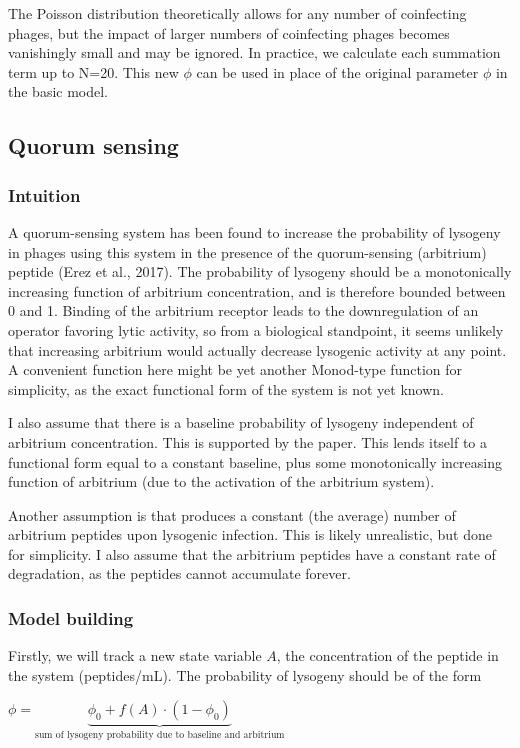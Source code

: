 \documentclass{article}
\begin{document}
 
The Poisson distribution theoretically allows for any number of coinfecting phages, but the impact of larger numbers of coinfecting phages becomes vanishingly small and may be ignored. In practice, we calculate each summation term up to N=20. This new $\phi$ can be used in place of the original parameter $\phi$ in the basic model.

\subsection{Quorum sensing}
\subsubsection{Intuition}
A quorum-sensing system has been found to increase the probability of lysogeny in phages using this system in the presence of the quorum-sensing (arbitrium) peptide (Erez et al., 2017). 
The probability of lysogeny should be a monotonically increasing function of arbitrium concentration, and is therefore bounded between 0 and 1. Binding of the arbitrium receptor leads to the downregulation of an operator favoring lytic activity, so from a biological standpoint, it seems unlikely that increasing arbitrium would actually decrease lysogenic activity at any point. A convenient function here might be yet another Monod-type function for simplicity, as the exact functional form of the system is not yet known. 

I also assume that there is a baseline probability of lysogeny independent of arbitrium concentration. This is supported by the paper. This lends itself to a functional form equal to a constant baseline, plus some monotonically increasing function of arbitrium (due to the activation of the arbitrium system).

Another assumption is that produces a constant (the average) number of arbitrium peptides upon lysogenic infection. This is likely unrealistic, but done for simplicity. I also assume that the arbitrium peptides have a constant rate of degradation, as the peptides cannot accumulate forever. 

\subsubsection{Model building}
Firstly, we will track a new state variable $A$, the concentration of the peptide in the system (peptides/mL). The probability of lysogeny should be of the form

\begin{center}
$ \phi = \underbrace{\phi_0 + f(A) \cdot (1-\phi_0)}_{\text{sum of lysogeny probability due to baseline and arbitrium}}$
\end{center}
\end{document}
